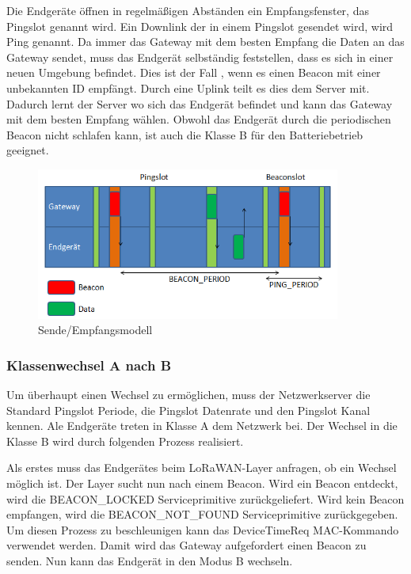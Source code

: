 \documentclass[a4paper, 12pt]{article}
\begin{document}
            Die Endgeräte öffnen in regelmäßigen Abständen ein Empfangsfenster, das Pingslot genannt wird. Ein Downlink 
            der in einem Pingslot gesendet wird, wird Ping genannt. Da immer das Gateway mit dem besten Empfang die 
            Daten an das Gateway sendet, muss das Endgerät selbständig feststellen, dass es sich in einer neuen Umgebung befindet.
            Dies ist der Fall , wenn es einen Beacon mit einer unbekannten ID empfängt. Durch eine Uplink teilt es dies 
            dem Server mit. 
            Dadurch lernt der Server wo sich das Endgerät befindet und kann das Gateway mit dem besten Empfang wählen.
            Obwohl das Endgerät durch die periodischen Beacon nicht schlafen kann, ist auch die Klasse B für den 
            Batteriebetrieb geeignet.

            
            \begin{figure}[ht]
                \centering
                \includegraphics[width=10cm]{KlasseB}
                \caption{Sende/Empfangsmodell}
            \end{figure}

            \subsubsection{Klassenwechsel A nach B}
                Um überhaupt einen Wechsel zu ermöglichen, muss der Netzwerkserver die Standard Pingslot Periode, die 
                Pingslot Datenrate und den Pingslot Kanal kennen. Ale Endgeräte treten in Klasse A dem Netzwerk bei. 
                Der Wechsel in die Klasse B wird durch folgenden Prozess realisiert.

                Als erstes muss das Endgerätes beim LoRaWAN-Layer anfragen, ob ein Wechsel möglich ist. 
                Der Layer sucht nun nach einem Beacon. Wird ein Beacon entdeckt, wird die BEACON\_LOCKED 
                Serviceprimitive 
                zurückgeliefert. Wird kein Beacon empfangen, wird die BEACON\_NOT\_FOUND Serviceprimitive 
                zurückgegeben. Um diesen Prozess zu beschleunigen kann das DeviceTimeReq 
                MAC-Kommando verwendet werden. Damit wird das Gateway aufgefordert einen Beacon zu senden. Nun kann 
                das Endgerät in den Modus B wechseln.
\end{document}
